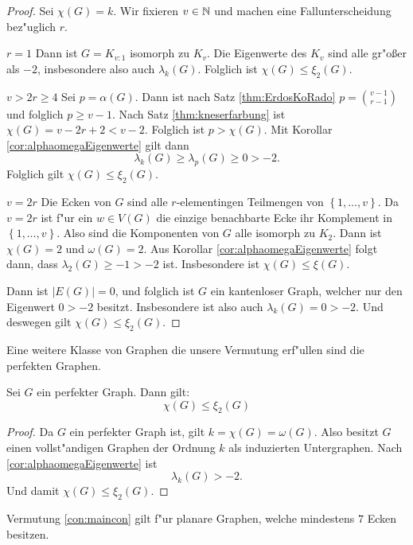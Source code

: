 \begin{proof}
  Sei $\chi(G) = k$. Wir fixieren $v\in {\mathbb{N}}$ und machen eine Fallunterscheidung bez"uglich $r$. 

   {$r=1$} Dann ist $G=K_{v:1}$ isomorph zu $K_v$. Die Eigenwerte des $K_v$ sind alle gr"o{\ss}er als $-2$, insbesondere also auch $\lambda_{k}(G)$. Folglich ist $\chi(G) \leq \xi_{2}(G)$. 

   {$v > 2r \geq 4 $} Sei $p = \alpha(G)$.  Dann ist nach Satz \ref{thm:ErdosKoRado} $ p = \binom{v-1}{r-1}$ und folglich $ p \geq v-1$. Nach Satz \ref{thm:kneserfarbung} ist $\chi(G) = v-2r+2 < v-2$. Folglich ist $p > \chi(G)$. Mit  Korollar \ref{cor:alphaomegaEigenwerte} gilt dann \begin{equation*}
    \lambda_{k}(G) \geq \lambda_{p}(G) \geq 0 > -2.
  \end{equation*}
  Folglich gilt $\chi(G) \leq \xi_{2}(G)$.

   {$ v = 2r $} Die Ecken von $G$ sind alle $r$-elementingen Teilmengen von $\left\{ 1,\dots,v \right\}$. Da $v=2r$ ist f"ur ein $w\in V(G)$ die einzige benachbarte Ecke ihr Komplement in $\left\{ 1,\dots,v \right\}$. Also sind die Komponenten von $G$ alle isomorph zu $K_{2}$. Dann ist $\chi(G) = 2$ und $\omega(G) = 2$. Aus Korollar \ref{cor:alphaomegaEigenwerte} folgt dann, dass $\lambda_{2}(G) \geq -1 > -2$ ist. Insbesondere ist $\chi(G) \leq \xi(G)$. 

   Dann ist $|E(G)| = 0$, und folglich ist $G$ ein kantenloser Graph, welcher nur den Eigenwert $0>-2$ besitzt. Insbesondere ist also auch $\lambda_{k}(G) = 0 > -2$. Und deswegen gilt $\chi(G) \leq \xi_{2}(G)$.
\end{proof}
Eine weitere Klasse von Graphen die unsere Vermutung erf"ullen sind die perfekten Graphen.
\begin{proposition}
  Sei $G$ ein perfekter Graph. Dann gilt:
  $$\chi(G) \leq \xi_{2}(G)$$
\end{proposition}

\begin{proof}
  Da $G$ ein perfekter Graph ist, gilt $k = \chi(G) = \omega(G)$. Also besitzt $G$ einen vollst"andigen Graphen der Ordnung $k$ als induzierten Untergraphen. Nach \ref{cor:alphaomegaEigenwerte} ist $$\lambda_{k}(G) > -2.$$ Und damit $\chi(G) \leq \xi_{2}(G)$.
\end{proof}

\begin{proposition}
  Vermutung \ref{con:maincon} gilt f"ur planare Graphen, welche mindestens $7$ Ecken besitzen.
\end{proposition}

